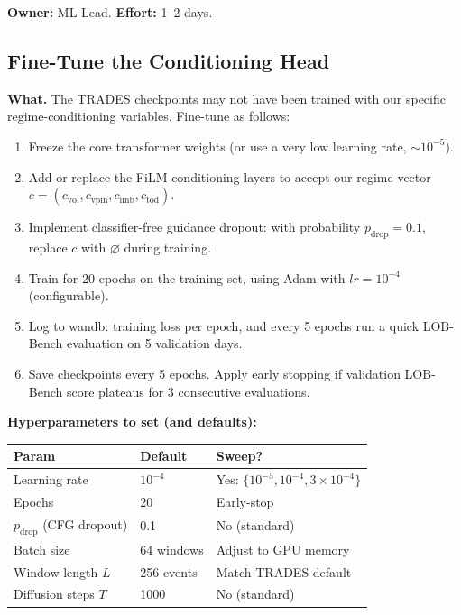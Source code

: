 \documentclass[11pt,a4paper]{article}
\begin{document}
\textbf{Owner:} ML Lead. \quad \textbf{Effort:} 1--2 days.

\subsection{Fine-Tune the Conditioning Head}

\textbf{What.}
The TRADES checkpoints may not have been trained with our specific regime-conditioning variables.  Fine-tune as follows:

\begin{enumerate}[nosep]
  \item Freeze the core transformer weights (or use a very low learning rate, $\sim 10^{-5}$).
  \item Add or replace the FiLM conditioning layers to accept our regime vector $c = (c_{\text{vol}}, c_{\text{vpin}}, c_{\text{imb}}, c_{\text{tod}})$.
  \item Implement classifier-free guidance dropout: with probability $p_{\text{drop}} = 0.1$, replace $c$ with $\varnothing$ during training.
  \item Train for 20 epochs on the training set, using Adam with $lr = 10^{-4}$ (configurable).
  \item Log to wandb: training loss per epoch, and every 5 epochs run a quick LOB-Bench evaluation on 5 validation days.
  \item Save checkpoints every 5 epochs.  Apply early stopping if validation LOB-Bench score plateaus for 3 consecutive evaluations.
\end{enumerate}

\textbf{Hyperparameters to set (and defaults):}

\begin{center}
\begin{tabular}{lll}
\toprule
\textbf{Param} & \textbf{Default} & \textbf{Sweep?} \\
\midrule
Learning rate & $10^{-4}$ & Yes: $\{10^{-5}, 10^{-4}, 3 \times 10^{-4}\}$ \\
Epochs & 20 & Early-stop \\
$p_{\text{drop}}$ (CFG dropout) & 0.1 & No (standard) \\
Batch size & 64 windows & Adjust to GPU memory \\
Window length $L$ & 256 events & Match TRADES default \\
Diffusion steps $T$ & 1000 & No (standard) \\
\bottomrule
\end{tabular}
\end{center}
\end{document}
